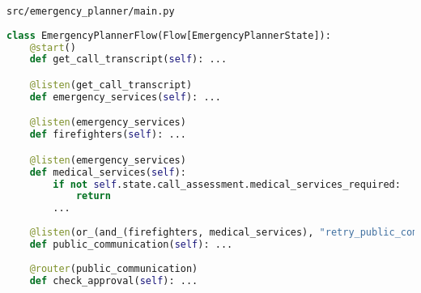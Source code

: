 \begin{frame}[fragile]{\texttt{src/emergency\_planner/main.py}}
    \vspace{-0.3cm}
    \begin{lstlisting}[language=Python]
class EmergencyPlannerFlow(Flow[EmergencyPlannerState]):
    @start()
    def get_call_transcript(self): ...

    @listen(get_call_transcript)
    def emergency_services(self): ...

    @listen(emergency_services)
    def firefighters(self): ...

    @listen(emergency_services)
    def medical_services(self):
        if not self.state.call_assessment.medical_services_required:
            return
        ...
    
    @listen(or_(and_(firefighters, medical_services), "retry_public_communication"))
    def public_communication(self): ...
    
    @router(public_communication)
    def check_approval(self): ...
\end{lstlisting}
\end{frame}